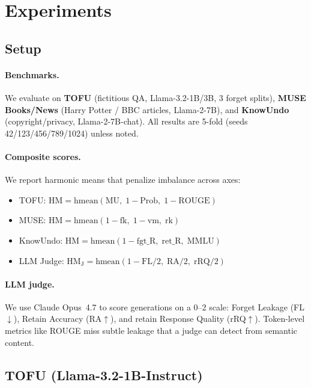 \section{Experiments}
\label{sec:results}

\subsection{Setup}

\paragraph{Benchmarks.}
We evaluate on \textbf{TOFU} \citep{maini2024tofu} (fictitious QA, Llama-3.2-1B/3B, 3 forget splits),
\textbf{MUSE Books/News} \citep{shi2025muse} (Harry Potter / BBC articles, Llama-2-7B),
and \textbf{KnowUndo} \citep{tian2024knowundo} (copyright/privacy, Llama-2-7B-chat).
All results are 5-fold (seeds 42/123/456/789/1024) unless noted.

\paragraph{Composite scores.} We report harmonic means that penalize imbalance across axes:
\begin{itemize}[leftmargin=*, topsep=2pt, itemsep=0pt]
    \item TOFU: $\text{HM} = \text{hmean}(\text{MU},\; 1{-}\text{Prob},\; 1{-}\text{ROUGE})$
    \item MUSE: $\text{HM} = \text{hmean}(1{-}\text{fk},\; 1{-}\text{vm},\; \text{rk})$
    \item KnowUndo: $\text{HM} = \text{hmean}(1{-}\text{fgt\_R},\; \text{ret\_R},\; \text{MMLU})$
    \item LLM Judge: $\text{HM}_\text{J} = \text{hmean}(1{-}\text{FL}/2,\; \text{RA}/2,\; \text{rRQ}/2)$
\end{itemize}

\paragraph{LLM judge.} We use Claude Opus~4.7 to score generations on a 0--2 scale: Forget Leakage (FL$\downarrow$), Retain Accuracy (RA$\uparrow$), and retain Response Quality (rRQ$\uparrow$). Token-level metrics like ROUGE miss subtle leakage that a judge can detect from semantic content.

\subsection{TOFU (Llama-3.2-1B-Instruct)}
\label{sec:tofu_1b}

